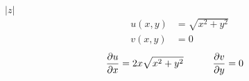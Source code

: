 \item[4.] $|z|$
\begin{align*}
    u(x,y) &= \sqrt{x^2+y^2}\\
    v(x,y) &= 0
\end{align*}
\begin{align*}
    \frac{\partial u}{\partial x}  &= 2x\sqrt{x^2+y^2}  &\qquad \frac{\partial v}{\partial y}  &= 0
\end{align*}
